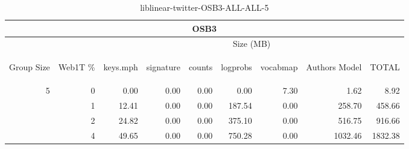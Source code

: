 \begin{center}
\begin{table}[htbp] 
 \begin{center}
\begin{tabular}{ | r | r | r | r | r | r | r | r | r |}
\hline
\multicolumn{9}{|c|}{OSB3}\\
\hline
 & & \multicolumn{7}{|c|}{Size (MB)}\\ \cline{3-9}
\begin{sideways}Group Size\end{sideways} & \begin{sideways}Web1T \% \end{sideways} & \begin{sideways}keys.mph\end{sideways} & \begin{sideways}signature\end{sideways} & \begin{sideways}counts\end{sideways} & \begin{sideways}logprobs\end{sideways} & \begin{sideways}vocabmap\end{sideways} & \begin{sideways}Authors Model \end{sideways} & \begin{sideways}TOTAL\end{sideways}\\
\hline
\multirow{3}{*}{5}
 & 0 & 0.00 & 0.00 & 0.00 & 0.00 & 7.30 & 1.62 & 8.92\\ \cline{2-9}
 & 1 & 12.41 & 0.00 & 0.00 & 187.54 & 0.00 & 258.70 & 458.66\\ \cline{2-9}
 & 2 & 24.82 & 0.00 & 0.00 & 375.10 & 0.00 & 516.75 & 916.66\\ \cline{2-9}
 & 4 & 49.65 & 0.00 & 0.00 & 750.28 & 0.00 & 1032.46 & 1832.38\\ \cline{2-9}
\hline
\end{tabular}
\caption{liblinear-twitter-OSB3-ALL-ALL-5}
\label{table:liblinear-twitter-OSB3-ALL-ALL-5}
\end{center}
 \end{table}
\end{center}

